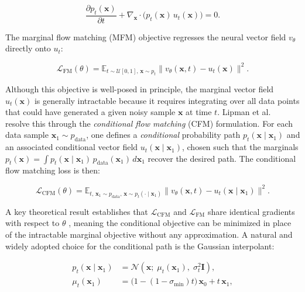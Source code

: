 \begin{equation}
    \frac{\partial p_t(\mathbf{x})}{\partial t} + \nabla_{\mathbf{x}} \cdot \bigl(p_t(\mathbf{x})\, u_t(\mathbf{x})\bigr) = 0.
    \label{eq:continuity}
\end{equation}

The marginal flow matching (MFM) objective regresses the neural vector field $v_\theta$
directly onto $u_t$:

\begin{equation}
    \mathcal{L}_{\text{FM}}(\theta) = \mathbb{E}_{t \sim \mathcal{U}[0,1],\, \mathbf{x} \sim p_t}
    \bigl\| v_\theta(\mathbf{x}, t) - u_t(\mathbf{x}) \bigr\|^2.
    \label{eq:fm_loss}
\end{equation}

Although this objective is well-posed in principle, the marginal vector field $u_t(\mathbf{x})$
is generally intractable because it requires integrating over all data points that
could have generated a given noisy sample $\mathbf{x}$ at time $t$. Lipman et al.\
\cite{lipman2022flow} resolve this through the \emph{conditional flow matching} (CFM)
formulation. For each data sample $\mathbf{x}_1 \sim p_{\text{data}}$, one defines a
\emph{conditional} probability path $p_t(\mathbf{x} \mid \mathbf{x}_1)$ and an
associated conditional vector field $u_t(\mathbf{x} \mid \mathbf{x}_1)$, chosen such
that the marginals $p_t(\mathbf{x}) = \int p_t(\mathbf{x} \mid \mathbf{x}_1)\,
p_{\text{data}}(\mathbf{x}_1)\, d\mathbf{x}_1$ recover the desired path. The
conditional flow matching loss is then:

\begin{equation}
    \mathcal{L}_{\text{CFM}}(\theta) = \mathbb{E}_{t,\, \mathbf{x}_1 \sim p_{\text{data}},\,
    \mathbf{x} \sim p_t(\cdot \mid \mathbf{x}_1)}
    \bigl\| v_\theta(\mathbf{x}, t) - u_t(\mathbf{x} \mid \mathbf{x}_1) \bigr\|^2.
    \label{eq:cfm_loss}
\end{equation}

A key theoretical result establishes that $\mathcal{L}_{\text{CFM}}$ and
$\mathcal{L}_{\text{FM}}$ share identical gradients with respect to $\theta$
\cite{lipman2022flow}, meaning the conditional objective can be minimized in place of
the intractable marginal objective without any approximation. A natural and widely
adopted choice for the conditional path is the Gaussian interpolant:

\begin{align}
    p_t(\mathbf{x} \mid \mathbf{x}_1) &= \mathcal{N}\!\left(\mathbf{x};\; \mu_t(\mathbf{x}_1),\; \sigma_t^2 \mathbf{I}\right), \label{eq:gaussian_path}\\
    \mu_t(\mathbf{x}_1) &= \bigl(1 - (1 - \sigma_{\min})t\bigr)\,\mathbf{x}_0 + t\,\mathbf{x}_1, \label{eq:interpolant_mean}
\end{align}


